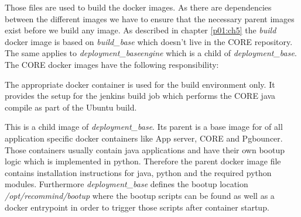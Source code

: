			Those files are used to build the docker images. As there are dependencies between the different images we have to ensure that the necessary parent images exist before we build any image. As described in chapter \ref{p01:ch5} the \emph{build} docker image is based on \emph{build\_base} which doesn't live in the CORE repository. The same applies to \emph{deployment\_baseengine} which is a child of \emph{deployment\_base}. The CORE docker images have the following responsibility:
			\begin{description}\sloppy
				\item[build] The appropriate docker container is used for the build environment only. It provides the setup for the jenkins build job which performs the CORE java compile as part of the Ubuntu build.
				\item[deployment\_baseengine] This is a child image of \emph{deployment\_base}. Its parent is a base image for of all application specific docker containers like App server, CORE and Pgbouncer. Those containers usually contain java applications and have their own bootup logic which is implemented in python. Therefore the parent docker image file contains installation instructions for java, python and the required python modules. Furthermore \emph{deployment\_base} defines the bootup location \emph{/opt/recommind/bootup} where the bootup scripts can be found as well as a docker entrypoint in order to trigger those scripts after container startup.
				

\end{description}

